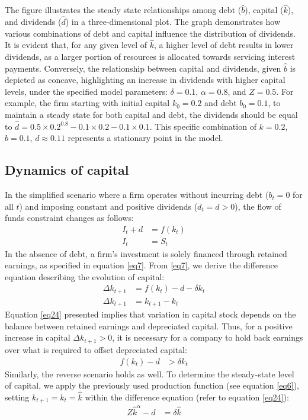 \documentclass[12pt]{report}
\begin{document}
The figure illustrates the steady state relationships among debt (\(\widehat{b}\)), capital (\(\widehat{k}\)), and
dividends  (\(\widehat{d}\)) in a three-dimensional plot. The graph demonstrates how various combinations of debt and
capital influence the distribution of dividends. It is evident that, for any given level of \(\hat{k}\), a higher level of debt results in lower
dividends, as a larger portion of resources is allocated towards servicing interest payments. Conversely, the
relationship between capital and dividends, given \(\hat{b}\) is depicted as concave, highlighting an increase in dividends with higher
capital levels, under the specified model parameters: \(\delta = 0.1\), \(\alpha = 0.8\), and \(Z = 0.5\).
For example, the firm starting with initial capital \(k_0 = 0.2\) and debt \(b_0 = 0.1\), to maintain a steady state for both
capital and  debt, the dividends should be equal to \(\widehat{d} = 0.5 \times 0.2^{0.8} - 0.1 \times 0.2 - 0.1
\times 0.1\). This specific combination of \(k= 0.2\), \(b = 0.1\), \(d \approx 0.11 \) represents a stationary point in the model.
\vspace{1cm}
\subsection{Dynamics of capital}
In the
simplified scenario where a firm operates without incurring debt (\(b_t = 0\) for all \(t\)) and imposing constant and
positive dividends (\(d_t=d>0\)), the flow of funds constraint changes as follows:
\begin{align}
    I_t + d &= f(k_{t}) \\
    I_t &= S_t \label{eq7}
\end{align}
In the absence of debt, a firm's investment is solely financed through retained earnings, as
specified in equation \ref{eq7}. From \ref{eq7}, we derive the difference equation describing the evolution of capital:
\begin{align}
    \Delta{k_{t+1}} &= f(k_{t}) - d -\delta k_t  \label{eq24}\\
    \Delta{k_{t+1}} &=k_{t+1}-k_t \nonumber
\end{align}
Equation \ref{eq24} presented implies that variation in capital stock depends on the balance between retained earnings and
depreciated capital. Thus, for a positive increase in capital \(\Delta{k_{t+1}} > 0\), it is necessary for a company to
hold back earnings over what is required to offset depreciated capital:
\begin{align*}
    f(k_{t}) - d &> \delta k_t
\end{align*}
Similarly, the reverse scenario holds as well.
To determine the steady-state level of capital, we apply the previously used production function (see equation \ref{eq6}),
setting \(k_{t+1}=k_{t}=\hat{k}\) within the difference equation (refer to equation \ref{eq24}): 
\begin{align}
    Z \hat{k}^{\alpha} - d&=  \delta \hat{k}
\end{align}
\end{document}
